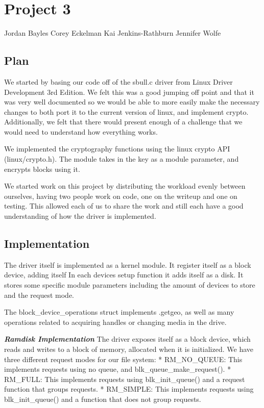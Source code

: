\section{Project 3}

Jordan Bayles Corey Eckelman Kai Jenkins-Rathburn Jennifer Wolfe

\subsection{Plan}

We started by basing our code off of the sbull.c driver from Linux
Driver Development 3rd Edition. We felt this was a good jumping off
point and that it was very well documented so we would be able to more
easily make the necessary changes to both port it to the current version
of linux, and implement crypto. Additionally, we felt that there would
present enough of a challenge that we would need to understand how
everything works.

We implemented the cryptography functions using the linux crypto API
(linux/crypto.h). The module takes in the key as a module parameter, and
encrypts blocks using it.

We started work on this project by distributing the workload evenly
between ourselves, having two people work on code, one on the writeup
and one on testing. This allowed each of us to share the work and still
each have a good understanding of how the driver is implemented.

\subsection{Implementation}

The driver itself is implemented as a kernel module. It register itself
as a block device, adding itself In each devices setup function it adds
itself as a disk. It stores some specific module parameters including
the amount of devices to store and the request mode.

The block\_device\_operations struct implements .getgeo, as well as many
operations related to acquiring handles or changing media in the drive.

\textbf{\emph{Ramdisk Implementation}} The driver exposes itself as a
block device, which reads and writes to a block of memory, allocated
when it is initialized. We have three different request modes for our
file system: * RM\_NO\_QUEUE: This implements requests using no queue,
and blk\_queue\_make\_request(). * RM\_FULL: This implements requests
using blk\_init\_queue() and a request function that groups requests. *
RM\_SIMPLE: This implements requests using blk\_init\_queue() and a
function that does not group requests.

